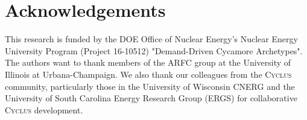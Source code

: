 \documentclass[11pt,letterpaper]{article}
\newcommand{\Cyclus}{\textsc{Cyclus}\xspace}%
\begin{document}
\section{Acknowledgements}
This research is funded by the \gls{DOE} Office of 
Nuclear Energy's Nuclear Energy University Program (Project 16-10512) 
"Demand-Driven Cycamore Archetypes". The authors want to thank 
members of the \gls{ARFC} group at the University of Illinois at 
Urbana-Champaign. 
We also thank our colleagues from the \Cyclus community, 
particularly those in the University of Wisconsin 
\gls{CNERG} and the University of South Carolina Energy Research 
Group (ERGS) for collaborative \Cyclus development.

\pagebreak 


\end{document}
